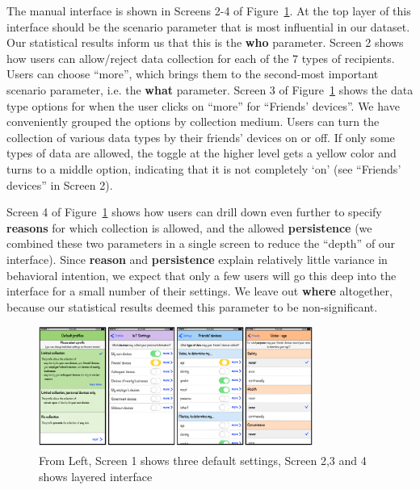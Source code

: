 The manual interface is shown in Screens 2-4 of Figure~\ref{fig:interface1}. At the top layer of this interface should be the scenario parameter that is most influential in our dataset. Our statistical results inform us that this is the \textbf{who} parameter. Screen 2 shows how users can allow/reject data collection for each of the 7 types of recipients. Users can choose ``more'', which brings them to the second-most important scenario parameter, i.e. the \textbf{what} parameter. Screen 3 of Figure~\ref{fig:interface1} shows the data type options for when the user clicks on ``more'' for ``Friends' devices''. We have conveniently grouped the options by collection medium. Users can turn the collection of various data types by their friends' devices on or off. If only some types of data are allowed, the toggle at the higher level gets a yellow color and turns to a middle option, indicating that it is not completely `on' (see ``Friends' devices'' in Screen 2).

Screen 4 of Figure~\ref{fig:interface1} shows how users can drill down even further to specify \textbf{reasons} for which collection is allowed, and the allowed \textbf{persistence} (we combined these two parameters in a single screen to reduce the ``depth'' of our interface). Since \textbf{reason} and \textbf{persistence} explain relatively little variance in behavioral intention, we expect that only a few users will go this deep into the interface for a small number of their settings. We leave out \textbf{where} altogether, because our statistical results deemed this parameter to be non-significant.

\begin{figure}
	\centering
	\includegraphics[width=0.8\textwidth]{figures/interface1.pdf}
	\caption{From Left, Screen 1 shows three default settings, Screen 2,3 and 4 shows layered interface}
	\label{fig:interface1}
\end{figure}

